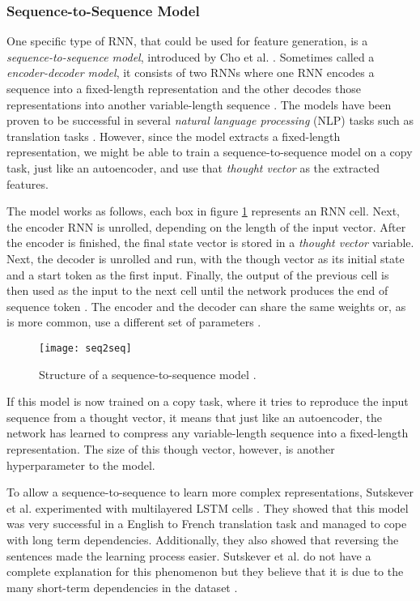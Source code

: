 \subsubsection{Sequence-to-Sequence Model}

One specific type of RNN, that could be used for feature generation, is a \textit{sequence-to-sequence model}, introduced by Cho et al. \cite{cho2014learning}.
Sometimes called a \textit{encoder-decoder model}, it consists of two RNNs where one RNN encodes a sequence into a fixed-length representation and the other decodes those representations into another variable-length sequence \cite{cho2014learning}.
The models have been proven to be successful in several \textit{natural language processing} (NLP) tasks such as translation tasks \cite{cho2014learning,sutskever_vinyals_le,tensorflowseq2seq}.
However, since the model extracts a fixed-length representation, we might be able to train a sequence-to-sequence model on a copy task, just like an autoencoder, and use that \textit{thought vector} as the extracted features.

The model works as follows, each box in figure \ref{fig:seq2seq} represents an RNN cell. Next, the encoder RNN is unrolled, depending on the length of the input vector.
After the encoder is finished, the final state vector is stored in a \textit{thought vector} variable.
Next, the decoder is unrolled and run, with the though vector as its initial state and a start token as the first input.
Finally, the output of the previous cell is then used as the input to the next cell until the network produces the end of sequence token \cite{cho2014learning}.
The encoder and the decoder can share the same weights or, as is more common, use a different set of parameters \cite{tensorflowseq2seq}.

\begin{figure}[h]
  \centering
  \texttt{[image: seq2seq]}
  \caption{Structure of a sequence-to-sequence model \cite{britz_2016_1}.}
  \label{fig:seq2seq}
\end{figure}

If this model is now trained on a copy task, where it tries to reproduce the input sequence from a thought vector, it means that just like an autoencoder,
the network has learned to compress any variable-length sequence into a fixed-length representation.
The size of this though vector, however, is another hyperparameter to the model.

To allow a sequence-to-sequence to learn more complex representations, Sutskever et al. experimented with multilayered LSTM cells \cite{sutskever_vinyals_le}.
They showed that this model was very successful in a English to French translation task and managed to cope with long term dependencies.
Additionally, they also showed that reversing the sentences made the learning process easier.
Sutskever et al. do not have a complete explanation for this phenomenon but they believe that it is due to the many short-term dependencies in the dataset \cite{sutskever_vinyals_le}.

